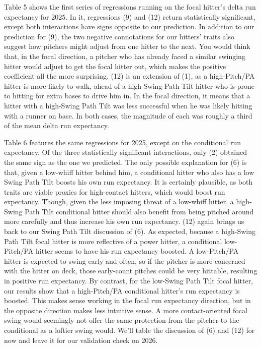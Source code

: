 \documentclass{article}
\begin{document}
Table 5 shows the first series of regressions running on the focal hitter's delta run expectancy for 2025. In it, regressions (9) and (12) return statistically significant, except both interactions have signs opposite to our prediction. In addition to our prediction for (9), the two negative connotations for our hitters' traits also suggest how pitchers might adjust from one hitter to the next. You would think that, in the focal direction, a pitcher who has already faced a similar swinging hitter would adjust to get the focal hitter out, which makes the positive coefficient all the more surprising. (12) is an extension of (1), as a high-Pitch/PA hitter is more likely to walk, ahead of a high-Swing Path Tilt hitter who is prone to hitting for extra bases to drive him in. In the focal direction, it means that a hitter with a high-Swing Path Tilt was less successful when he was likely hitting with a runner on base. In both cases, the magnitude of each was roughly a third of the mean delta run expectancy.

Table 6 features the same regressions for 2025, except on the conditional run expectancy. Of the three statistically significant interactions, only (2) obtained the same sign as the one we predicted. The only possible explanation for (6) is that, given a low-whiff hitter behind him, a conditional hitter who also has a low Swing Path Tilt boosts his own run expectancy. It is certainly plausible, as both traits are viable proxies for high-contact hitters, which would boost run expectancy. Though, given the less imposing threat of a low-whiff hitter, a high-Swing Path Tilt conditional hitter should also benefit from being pitched around more carefully and thus increase his own run expectancy. (12) again brings us back to our Swing Path Tilt discussion of (6). As expected, because a high-Swing Path Tilt focal hitter is more reflective of a power hitter, a conditional low-Pitch/PA hitter seems to have his run expectancy boosted. A low-Pitch/PA hitter is expected to swing early and often, so if the pitcher is more concerned with the hitter on deck, those early-count pitches could be very hittable, resulting in positive run expectancy. By contrast, for the low-Swing Path Tilt focal hitter, our results show that a high-Pitch/PA conditional hitter's run expectancy is boosted. This makes sense working in the focal run expectancy direction, but in the opposite direction makes less intuitive sense. A more contact-oriented focal swing would seemingly not offer the same protection from the pitcher to the conditional as a loftier swing would. We'll table the discussion of (6) and (12) for now and leave it for our validation check on 2026.
\end{document}
